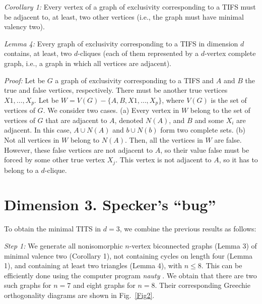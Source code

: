 \documentclass[%
 twocolumn,
 groupedaddress,
 showpacs,
 showkeys,
 preprintnumbers,
 amsmath,amssymb,
 aps,
 pra,
 longbibliography,
 floatfix,
 ]{revtex4-1}
\def\endproof{\vrule height6pt width6pt depth0pt}
\begin{document}

{\em Corollary 1:} Every vertex of a graph of exclusivity corresponding to a TIFS must be adjacent to, at least, two other vertices (i.e., the graph must have minimal valency two).


{\em Lemma 4:} Every graph of exclusivity corresponding to a TIFS in dimension $d$ contains, at least, two $d$-cliques (each of them represented by a $d$-vertex complete graph, i.e., a graph in which all vertices are adjacent).


{\em Proof:} Let be $G$ a graph of exclusivity corresponding to a TIFS and $A$ and $B$ the true and false vertices, respectively. There must be another true vertices $X1,\dots,X_p$. Let be $W=V(G)-\{A,B,X1,\dots,X_p\}$, where $V(G)$ is the set of vertices of $G$. We consider two cases. (a) Every vertex in $W$ belong to the set of vertices of $G$ that are adjacent to $A$, denoted $N(A)$, and $B$ and some $X_i$ are adjacent. In this case, $A \cup N(A)$ and $b \cup N(b)$ form two complete sets. (b) Not all vertices in $W$ belong to $N(A)$. Then, all the vertices in $W$ are false. However, these false vertices are not adjacent to $A$, so their value false must be forced by some other true vertex $X_j$. This vertex is not adjacent to $A$, so it has to belong to a $d$-clique.\hfill \endproof


\section{Dimension 3. Specker's ``bug''}


To obtain the minimal TITS in $d=3$, we combine the previous results as follows:

{\em Step 1:} We generate all nonisomorphic $n$-vertex biconnected graphs (Lemma 3) of minimal valence two (Corollary 1), not containing cycles on length four (Lemma 1), and containing at least two triangles (Lemma 4), with $n \leq 8$. This can be efficiently done using the computer program {\em nauty} \cite{McKay07}. We obtain that there are two such graphs for $n=7$ and eight graphs for $n=8$. Their corresponding Greechie orthogonality diagrams are shown in Fig.~\ref{Fig2}.
\end{document}
